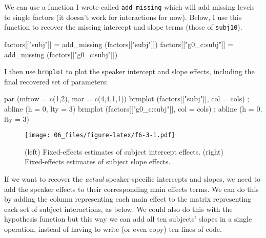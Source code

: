 \documentclass[
]{book}
\newenvironment{Shaded}{\begin{snugshade}}{\end{snugshade}}
\newcommand{\AttributeTok}[1]{\textcolor[rgb]{0.77,0.63,0.00}{#1}}
\newcommand{\DecValTok}[1]{\textcolor[rgb]{0.00,0.00,0.81}{#1}}
\newcommand{\FunctionTok}[1]{\textcolor[rgb]{0.00,0.00,0.00}{#1}}
\newcommand{\NormalTok}[1]{#1}
\newcommand{\OtherTok}[1]{\textcolor[rgb]{0.56,0.35,0.01}{#1}}
\newcommand{\StringTok}[1]{\textcolor[rgb]{0.31,0.60,0.02}{#1}}
\begin{document}
We can use a function I wrote called \texttt{add\_missing} which will add missing levels to single factors (it doesn't work for interactions for now). Below, I use this function to recover the missing intercept and slope terms (those of \texttt{subj10}).

\begin{Shaded}
\begin{Highlighting}[]
\NormalTok{factors[[}\StringTok{"subj"}\NormalTok{]] }\OtherTok{=} \FunctionTok{add\_missing}\NormalTok{ (factors[[}\StringTok{"subj"}\NormalTok{]])}
\NormalTok{factors[[}\StringTok{"g0\_c:subj"}\NormalTok{]] }\OtherTok{=} \FunctionTok{add\_missing}\NormalTok{ (factors[[}\StringTok{"g0\_c:subj"}\NormalTok{]])}
\end{Highlighting}
\end{Shaded}

I then use \texttt{brmplot} to plot the speaker intercept and slope effects, including the final recovered set of parameters:

\begin{Shaded}
\begin{Highlighting}[]
\FunctionTok{par}\NormalTok{ (}\AttributeTok{mfrow =} \FunctionTok{c}\NormalTok{(}\DecValTok{1}\NormalTok{,}\DecValTok{2}\NormalTok{), }\AttributeTok{mar =} \FunctionTok{c}\NormalTok{(}\DecValTok{4}\NormalTok{,}\DecValTok{4}\NormalTok{,}\DecValTok{1}\NormalTok{,}\DecValTok{1}\NormalTok{))}
\FunctionTok{brmplot}\NormalTok{ (factors[[}\StringTok{"subj"}\NormalTok{]], }\AttributeTok{col =}\NormalTok{ cols) ; }\FunctionTok{abline}\NormalTok{ (}\AttributeTok{h =} \DecValTok{0}\NormalTok{, }\AttributeTok{lty =} \DecValTok{3}\NormalTok{)}
\FunctionTok{brmplot}\NormalTok{ (factors[[}\StringTok{"g0\_c:subj"}\NormalTok{]], }\AttributeTok{col =}\NormalTok{ cols) ; }\FunctionTok{abline}\NormalTok{ (}\AttributeTok{h =} \DecValTok{0}\NormalTok{, }\AttributeTok{lty =} \DecValTok{3}\NormalTok{)}
\end{Highlighting}
\end{Shaded}

\begin{figure}
\centering
\texttt{[image: 06\_files/figure-latex/f6-3-1.pdf]}
\caption{\label{fig:f6-3}(left) Fixed-effects estimates of subject intercept effects. (right) Fixed-effects estimates of subject slope effects.}
\end{figure}

If we want to recover the \emph{actual} speaker-specific intercepts and slopes, we need to add the speaker effects to their corresponding main effects terms. We can do this by adding the column representing each main effect to the matrix representing each set of subject interactions, as below. We could also do this with the hypothesis function but this way we can add all ten subjects' slopes in a single operation, instead of having to write (or even copy) ten lines of code.
\end{document}
